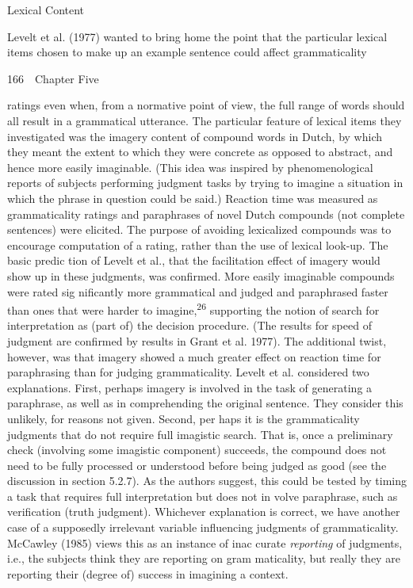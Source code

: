 \begin{styleHeadingviii}
Lexical Content
\end{styleHeadingviii}


\begin{styleTextbody}
Levelt et al. (1977) wanted to bring home the point that the particular lexical items chosen to make up an example sentence could affect grammaticality
\end{styleTextbody}


\clearpage\setcounter{page}{1}\begin{styleStandard}
166\ \ Chapter Five
\end{styleStandard}


\begin{styleTextbody}
ratings even when, from a normative point of view, the full range of words should all result in a grammatical utterance. The particular feature of lexical items they investigated was the imagery content of compound words in Dutch, by which they meant the extent to which they were concrete as opposed to abstract, and hence more easily imaginable. (This idea was inspired by phenomenological reports of subjects performing judgment tasks by trying to imagine a situation in which the phrase in question could be said.) Reaction time was measured as grammaticality ratings and paraphrases of novel Dutch compounds (not complete sentences) were elicited. The purpose of avoiding lexicalized compounds was to encourage computation of a rating, rather than the use of lexical look-up. The basic predic\- tion of Levelt et al., that the facilitation effect of imagery would show up in these judgments, was confirmed. More easily imaginable compounds were rated sig\- nificantly more grammatical and judged and paraphrased faster than ones that were harder to imagine,\textsuperscript{26}\textsuperscript{ }supporting the notion of search for interpretation as (part of) the decision procedure. (The results for speed of judgment are confirmed by results in Grant et al. 1977). The additional twist, however, was that imagery showed a much greater effect on reaction time for paraphrasing than for judging grammaticality. Levelt et al. considered two explanations. First, perhaps imagery is involved in the task of generating a paraphrase, as well as in comprehending the original sentence. They consider this unlikely, for reasons not given. Second, per\- haps it is the grammaticality judgments that do not require full imagistic search. That is, once a preliminary check (involving some imagistic component) succeeds, the compound does not need to be fully processed or understood before being judged as good (see the discussion in section 5.2.7). As the authors suggest, this could be tested by timing a task that requires full interpretation but does not in\- volve paraphrase, such as verification (truth judgment). Whichever explanation is correct, we have another case of a supposedly irrelevant variable influencing judgments of grammaticality. McCawley (1985) views this as an instance of inac\- curate \textit{reporting}\textit{ }of judgments, i.e., the subjects think they are reporting on gram\- maticality, but really they are reporting their (degree of) success in imagining a context.
\end{styleTextbody}


